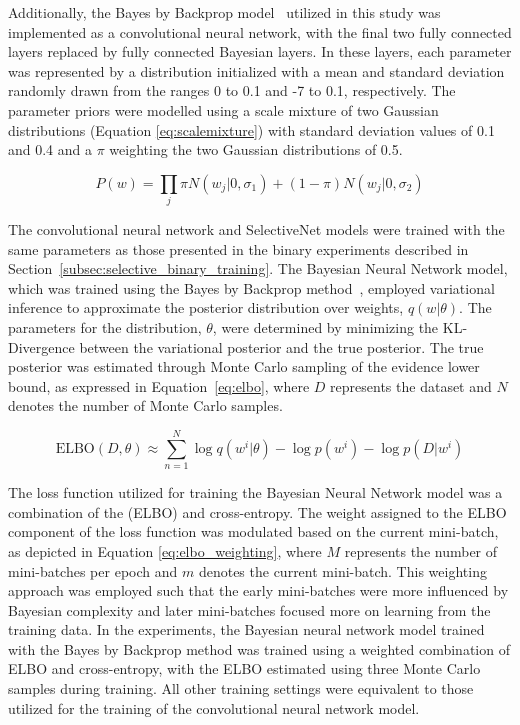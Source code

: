 Additionally, the Bayes by Backprop model~\citep{Blundell2015Weight} utilized in this study was implemented as a convolutional neural network, with the final two fully connected layers replaced by fully connected Bayesian layers. In these layers, each parameter was represented by a distribution initialized with a mean and standard deviation randomly drawn from the ranges 0 to 0.1 and -7 to 0.1, respectively. The parameter priors were modelled using a scale mixture of two Gaussian distributions (Equation \ref{eq:scalemixture}) with standard deviation values of 0.1 and 0.4 and a $\pi$ weighting the two Gaussian distributions of 0.5.

\begin{equation}
	P(w) = \prod_j\pi N(w_j|0, \sigma_1) + (1-\pi) N(w_j|0, \sigma_2)
	\label{eq:scalemixture}
\end{equation}

The convolutional neural network and SelectiveNet models were trained with the same parameters as those presented in the binary experiments described in Section~\ref{subsec:selective_binary_training}. The Bayesian Neural Network model, which was trained using the Bayes by Backprop method~\citep{Blundell2015Weight}, employed variational inference to approximate the posterior distribution over weights, $q(w|\theta)$. The parameters for the distribution, $\theta$, were determined by minimizing the KL-Divergence between the variational posterior and the true posterior. The true posterior was estimated through Monte Carlo sampling of the evidence lower bound, as expressed in Equation~\ref{eq:elbo}, where $D$ represents the dataset and $N$ denotes the number of Monte Carlo samples.

\begin{equation}
	\text{ELBO}(D, \theta) \approx \sum^N_{n=1}\log q(w^i|\theta)-\log p(w^i) - \log p(D|w^i)
	\label{eq:elbo}
\end{equation}

The loss function utilized for training the Bayesian Neural Network model was a combination of the (ELBO) and cross-entropy. The weight assigned to the ELBO component of the loss function was modulated based on the current mini-batch, as depicted in Equation \ref{eq:elbo_weighting}, where $M$ represents the number of mini-batches per epoch and $m$ denotes the current mini-batch. This weighting approach was employed such that the early mini-batches were more influenced by Bayesian complexity and later mini-batches focused more on learning from the training data. In the experiments, the Bayesian neural network model trained with the Bayes by Backprop method was trained using a weighted combination of ELBO and cross-entropy, with the ELBO estimated using three Monte Carlo samples during training. All other training settings were equivalent to those utilized for the training of the convolutional neural network model.

